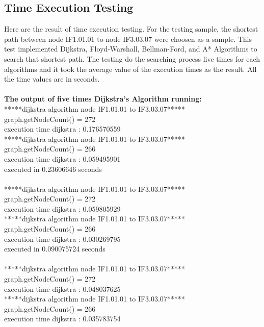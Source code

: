 \subsection{Time Execution Testing}
Here are the result of time execution testing. For the testing sample, the shortest path between node IF1.01.01 to node IF3.03.07 were choosen as a sample. This test implemented Dijkstra, Floyd-Warshall, Bellman-Ford, and A* Algorithms to search that shortest path. The testing do the searching process five times for each algorithms and it took the average value of the execution times as the result. All the time values are in seconds. 
\\\\
\textbf{The output of five times Dijkstra's Algorithm running:}\\
*****dijkstra algorithm node IF1.01.01 to IF3.03.07*****\\
graph.getNodeCount() = 272\\
execution time dijkstra : 0.176570559\\
*****dijkstra algorithm node IF1.01.01 to IF3.03.07*****\\
graph.getNodeCount() = 266\\
execution time dijkstra : 0.059495901\\
executed in 0.23606646 seconds\\
\\
*****dijkstra algorithm node IF1.01.01 to IF3.03.07*****\\
graph.getNodeCount() = 272\\
execution time dijkstra : 0.059805929\\
*****dijkstra algorithm node IF1.01.01 to IF3.03.07*****\\
graph.getNodeCount() = 266\\
execution time dijkstra : 0.030269795\\
executed in 0.090075724 seconds\\
\\
*****dijkstra algorithm node IF1.01.01 to IF3.03.07*****\\
graph.getNodeCount() = 272\\
execution time dijkstra : 0.048037625\\
*****dijkstra algorithm node IF1.01.01 to IF3.03.07*****\\
graph.getNodeCount() = 266\\
execution time dijkstra : 0.035783754\\
